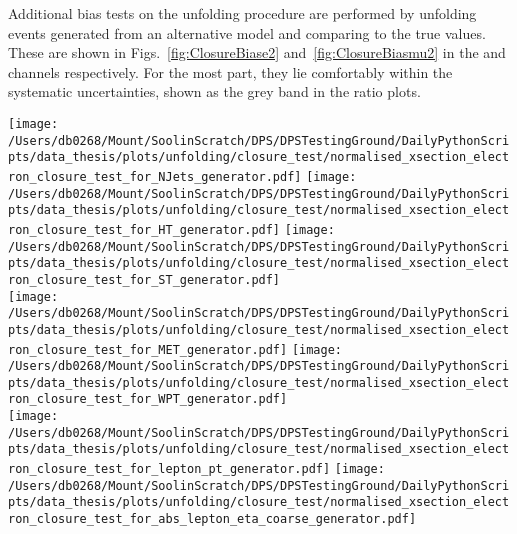 Additional bias tests on the unfolding procedure are performed by unfolding \ttbar{} events generated from an alternative model and comparing to the true values.
These are shown in Figs.~\ref{fig:ClosureBiase2} and~\ref{fig:ClosureBiasmu2} in the \eJets{} and \muJets{} channels respectively.
For the most part, they lie comfortably within the systematic uncertainties, shown as the grey band in the ratio plots.
\begin{figure*}[htpb]
	\centering
	\texttt{[image: /Users/db0268/Mount/SoolinScratch/DPS/DPSTestingGround/DailyPythonScripts/data\_thesis/plots/unfolding/closure\_test/normalised\_xsection\_electron\_closure\_test\_for\_NJets\_generator.pdf]} 
	\texttt{[image: /Users/db0268/Mount/SoolinScratch/DPS/DPSTestingGround/DailyPythonScripts/data\_thesis/plots/unfolding/closure\_test/normalised\_xsection\_electron\_closure\_test\_for\_HT\_generator.pdf]} 
	\texttt{[image: /Users/db0268/Mount/SoolinScratch/DPS/DPSTestingGround/DailyPythonScripts/data\_thesis/plots/unfolding/closure\_test/normalised\_xsection\_electron\_closure\_test\_for\_ST\_generator.pdf]} \\
	\texttt{[image: /Users/db0268/Mount/SoolinScratch/DPS/DPSTestingGround/DailyPythonScripts/data\_thesis/plots/unfolding/closure\_test/normalised\_xsection\_electron\_closure\_test\_for\_MET\_generator.pdf]} 
	\texttt{[image: /Users/db0268/Mount/SoolinScratch/DPS/DPSTestingGround/DailyPythonScripts/data\_thesis/plots/unfolding/closure\_test/normalised\_xsection\_electron\_closure\_test\_for\_WPT\_generator.pdf]} \\
	\texttt{[image: /Users/db0268/Mount/SoolinScratch/DPS/DPSTestingGround/DailyPythonScripts/data\_thesis/plots/unfolding/closure\_test/normalised\_xsection\_electron\_closure\_test\_for\_lepton\_pt\_generator.pdf]} 
	\texttt{[image: /Users/db0268/Mount/SoolinScratch/DPS/DPSTestingGround/DailyPythonScripts/data\_thesis/plots/unfolding/closure\_test/normalised\_xsection\_electron\_closure\_test\_for\_abs\_lepton\_eta\_coarse\_generator.pdf]} \\
	\caption[The cross sections for the alternate \ttbar{} production models unfolded using the \powhegpythia{} derived response matrix compared to the true model cross sections are shown for all event variables in the \eJets{} channel in the upper panels. The lower panels give the ratio of the two cross sections known as the bias.]{The cross sections for the alternate \ttbar{} production models unfolded using the \powhegpythia{} derived response matrix compared to the true model cross sections are shown for all event variables in the \eJets{} channel in the upper panels. The lower panels give the ratio of the two cross sections known as the bias.}
	\label{fig:ClosureBiase2}
\end{figure*}

